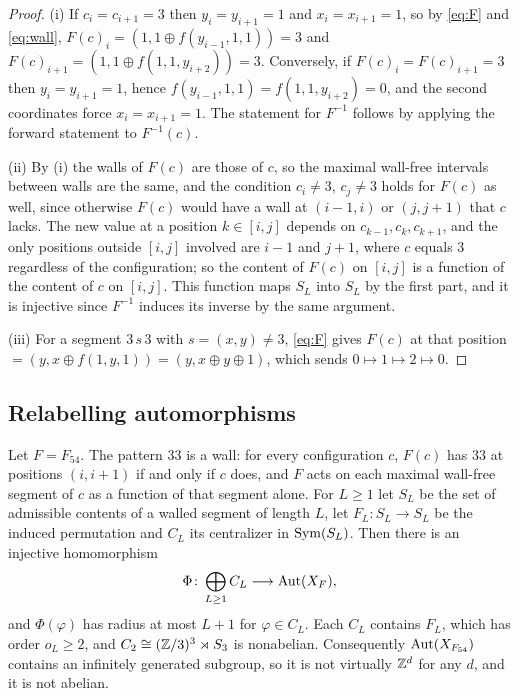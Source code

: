 \begin{proof}
(i) If $c_i=c_{i+1}=3$ then $y_i=y_{i+1}=1$ and $x_i=x_{i+1}=1$, so by \eqref{eq:F} and \eqref{eq:wall}, $F(c)_i=(1,1\oplus f(y_{i-1},1,1))=3$ and $F(c)_{i+1}=(1,1\oplus f(1,1,y_{i+2}))=3$. Conversely, if $F(c)_i=F(c)_{i+1}=3$ then $y_i=y_{i+1}=1$, hence $f(y_{i-1},1,1)=f(1,1,y_{i+2})=0$, and the second coordinates force $x_i=x_{i+1}=1$. The statement for $F^{-1}$ follows by applying the forward statement to $F^{-1}(c)$.

(ii) By (i) the walls of $F(c)$ are those of $c$, so the maximal wall-free intervals between walls are the same, and the condition $c_i\ne3$, $c_j\ne3$ holds for $F(c)$ as well, since otherwise $F(c)$ would have a wall at $(i-1,i)$ or $(j,j+1)$ that $c$ lacks. The new value at a position $k\in[i,j]$ depends on $c_{k-1},c_k,c_{k+1}$, and the only positions outside $[i,j]$ involved are $i-1$ and $j+1$, where $c$ equals $3$ regardless of the configuration; so the content of $F(c)$ on $[i,j]$ is a function of the content of $c$ on $[i,j]$. This function maps $S_L$ into $S_L$ by the first part, and it is injective since $F^{-1}$ induces its inverse by the same argument.

(iii) For a segment $3\,s\,3$ with $s=(x,y)\ne3$, \eqref{eq:F} gives $F(c)$ at that position $=(y,x\oplus f(1,y,1))=(y,x\oplus y\oplus1)$, which sends $0\mapsto1\mapsto2\mapsto0$.
\end{proof}

\subsection{Relabelling automorphisms}

\begin{theorem}\label{thm:54}
Let $F=F_{54}$. The pattern $33$ is a wall: for every configuration $c$, $F(c)$ has $33$ at positions $(i,i+1)$ if and only if $c$ does, and $F$ acts on each maximal wall-free segment of $c$ as a function of that segment alone. For $L\ge1$ let $S_L$ be the set of admissible contents of a walled segment of length $L$, let $F_L\colon S_L\to S_L$ be the induced permutation and $C_L$ its centralizer in $\operatorname{Sym}(S_L)$. Then there is an injective homomorphism
\[
\Phi\colon\bigoplus_{L\ge1}C_L\longrightarrow\operatorname{Aut}(X_F),
\]
and $\Phi(\varphi)$ has radius at most $L+1$ for $\varphi\in C_L$. Each $C_L$ contains $F_L$, which has order $o_L\ge 2$, and $C_2\cong(\mathbb{Z}/3)^3\rtimes S_3$ is nonabelian. Consequently $\operatorname{Aut}(X_{F_{54}})$ contains an infinitely generated subgroup, so it is not virtually $\mathbb{Z}^d$ for any $d$, and it is not abelian.
\end{theorem}

